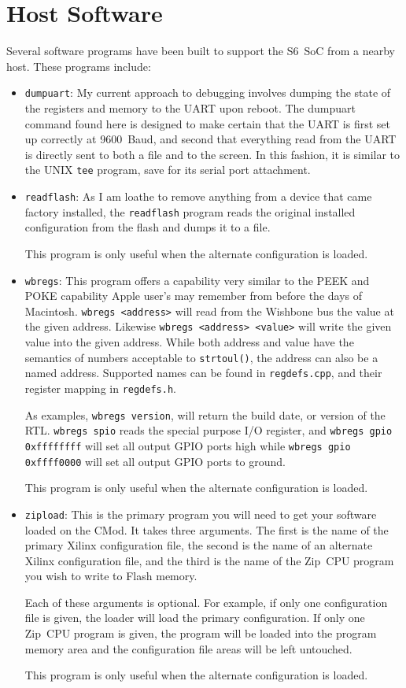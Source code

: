 \documentclass{gqtekspec}
\begin{document}
\section{Host Software}
Several software programs have been built to support the S6~SoC from a nearby
host.  These programs include:
\begin{itemize}
\item {\tt dumpuart}: My current approach to debugging involves
	dumping the state of the registers and memory to the
	UART upon reboot.  The dumpuart command found here is
	designed to make certain that the UART is first set
	up correctly at 9600~Baud, and second that everything
	read from the UART is directly sent to both a file and
	to the screen.  In this fashion, it is similar to the
	UNIX {\tt tee} program, save for its serial port
	attachment.
\item {\tt readflash}: As I am loathe to remove anything from
	a device that came factory installed, the
	{\tt readflash} program reads the original installed
	configuration from the flash and dumps it to a file.

	This program is only useful when the alternate configuration is loaded.

\item {\tt wbregs}: This program offers a capability very similar to the 
	PEEK and POKE capability Apple user's may remember from before the
	days of Macintosh.  {\tt wbregs <address>} will read from the
	Wishbone bus the value at the given address.  Likewise
	{\tt wbregs <address> <value>} will write the given value into the
	given address.  While both address and value have the semantics of
	numbers acceptable to {\tt strtoul()}, the address can also be a named
	address.  Supported names can be found in {\tt regdefs.cpp}, and their
	register mapping in {\tt regdefs.h}.

	As examples, {\tt wbregs version}, will return the build date, or
	version of the RTL.  {\tt wbregs spio} reads the special purpose
	I/O register, and {\tt wbregs gpio 0xffffffff} will set all output
	GPIO ports high while {\tt wbregs gpio 0xffff0000} will set all 
	output GPIO ports to ground.

	This program is only useful when the alternate configuration is loaded.

\item {\tt zipload}: This is the primary program you will need to get your
	software loaded on the CMod.  It takes three arguments.  The first is
	the name of the primary Xilinx configuration file, the second is the
	name of an alternate Xilinx configuration file, and the third is the
	name of the Zip~CPU program you wish to write to Flash memory.

	Each of these arguments is optional.  For example, if only one
	configuration file is given, the loader will load the primary
	configuration.  If only one Zip~CPU program is given, the program will
	be loaded into the program memory area and the configuration file areas
	will be left untouched.

	This program is only useful when the alternate configuration is loaded.
\end{itemize}
\end{document}
